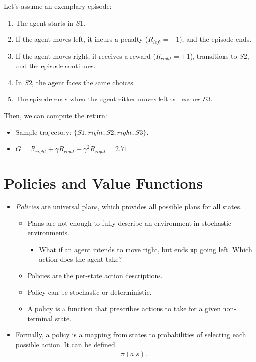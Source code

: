 Let's assume an exemplary episode:
\begin{enumerate}
	\item The agent starts in $S1$.
	\item If the agent moves left, it incurs a penalty ($R_{left}=-1$), and the episode ends.
	\item If the agent moves right, it receives a reward ($R_{right}=+1$), transitions to $S2$, and the episode continues.
	\item In $S2$, the agent faces the same choices.
	\item The episode ends when the agent either moves left or reaches $S3$.
\end{enumerate}

Then, we can compute the return:
\begin{itemize}
	\item Sample trajectory: $\{S1,right,S2,right,S3\}$.
	\item $G=R_{right}+\gamma R_{right}+\gamma^2R_{right}=2.71$ 
\end{itemize}

\section{Policies and Value Functions}
\begin{itemize}
	\item \textit{Policies} are universal plans, which provides all possible plans for all states. 
		\begin{itemize}
			\item Plans are not enough to fully describe an environment in stochastic environments.
				\begin{itemize}
					\item What if an agent intends to move right, but ends up going left. Which action does the agent take?
				\end{itemize}
			\item Policies are the per-state action descriptions.
			\item Policy can be stochastic or deterministic.
			\item A policy is a function that prescribes actions to take for a given non-terminal state.
		\end{itemize}
	\item Formally, a policy is a mapping from states to probabilities of selecting each possible action. It can be defined 
		\begin{align*}
			\pi(a|s).
		\end{align*}
\end{itemize}




